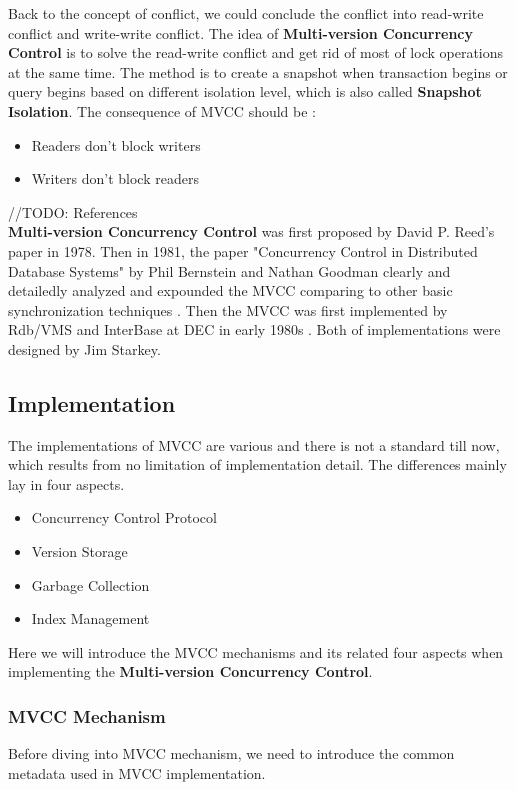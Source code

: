 Back to the concept of conflict, we could conclude the conflict into read-write conflict and write-write conflict. The idea of \textbf{Multi-version Concurrency Control} is to solve the read-write conflict and get rid of most of lock operations at the same time. The method is to create a snapshot when transaction begins or query begins based on different isolation level, which is also called \textbf{Snapshot Isolation}. The consequence of MVCC should be :
\begin{itemize}
	\item Readers don't block writers
	\item Writers don't block readers
\end{itemize}
//TODO: References\\
 \textbf{Multi-version Concurrency Control} was first proposed by David P. Reed's paper in 1978. Then in 1981, the paper "Concurrency Control in Distributed Database Systems" by Phil Bernstein and Nathan Goodman clearly and detailedly analyzed and expounded the MVCC comparing to other basic synchronization techniques \cite{Bernstein1981}. Then the MVCC was first implemented by Rdb/VMS and InterBase at DEC in early 1980s \cite{Bernstein1983}. Both of implementations were designed by Jim Starkey.

\subsection{Implementation}
The implementations of MVCC are various and there is not a standard till now, which results from no limitation of implementation detail. The differences mainly lay in four aspects.
\begin{itemize}
	\item Concurrency Control Protocol
	\item Version Storage
	\item Garbage Collection
	\item Index Management
\end{itemize}
Here we will introduce the MVCC mechanisms and its related four aspects when implementing the \textbf{Multi-version Concurrency Control}.
\subsubsection{MVCC Mechanism}
Before diving into MVCC mechanism, we need to introduce the common metadata used in MVCC implementation. \\

